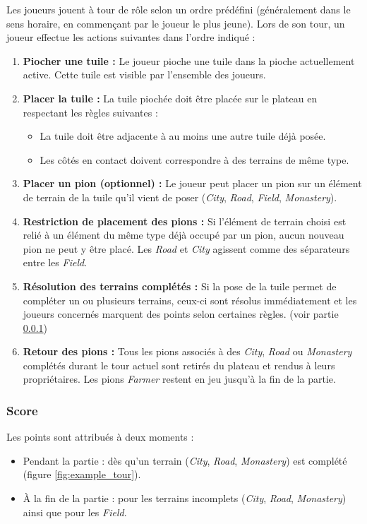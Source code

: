 \documentclass[11pt]{article}
\begin{document}
Les joueurs jouent à tour de rôle selon un ordre prédéfini (généralement dans le sens horaire, en commençant par le joueur le plus jeune). 
Lors de son tour, un joueur effectue les actions suivantes dans l’ordre indiqué :

\begin{enumerate}
  \item \textbf{Piocher une tuile :}  
  Le joueur pioche une tuile dans la pioche actuellement active. Cette tuile est visible par l’ensemble des joueurs.

  \item \textbf{Placer la tuile :}  
  La tuile piochée doit être placée sur le plateau en respectant les règles suivantes :
  \begin{itemize}
    \item[-] La tuile doit être adjacente à au moins une autre tuile déjà posée.
    \item[-] Les côtés en contact doivent correspondre à des terrains de même type.
  \end{itemize}

  \item \textbf{Placer un pion (optionnel) :}  
  Le joueur peut placer un pion sur un élément de terrain de la tuile qu’il vient de poser (\textit{City}, \textit{Road}, \textit{Field}, \textit{Monastery}).

  \item \textbf{Restriction de placement des pions :}  
  Si l’élément de terrain choisi est relié à un élément du même type déjà occupé par un pion, aucun nouveau pion ne peut y être placé.
  Les \textit{Road} et \textit{City} agissent comme des séparateurs entre les \textit{Field}.

  \item \textbf{Résolution des terrains complétés :}  
  Si la pose de la tuile permet de compléter un ou plusieurs terrains, ceux-ci sont résolus immédiatement et les joueurs concernés marquent des points selon certaines règles. (voir partie \ref{subsubsec:score})

  \item \textbf{Retour des pions :}  
  Tous les pions associés à des \textit{City}, \textit{Road} ou \textit{Monastery} complétés durant le tour actuel sont retirés du plateau et rendus à leurs propriétaires. Les pions \textit{Farmer} restent en jeu jusqu’à la fin de la partie.

\end{enumerate}

\subsubsection{Score}
\label{subsubsec:score}
Les points sont attribués à deux moments :
\begin{itemize}
  \item[$\bullet$] Pendant la partie : dès qu’un terrain  (\textit{City}, \textit{Road}, \textit{Monastery}) est complété (figure \ref{fig:example_tour}).
  \item[$\bullet$] À la fin de la partie : pour les terrains incomplets (\textit{City}, \textit{Road}, \textit{Monastery}) ainsi que pour les \textit{Field}.
\end{itemize}
\end{document}
